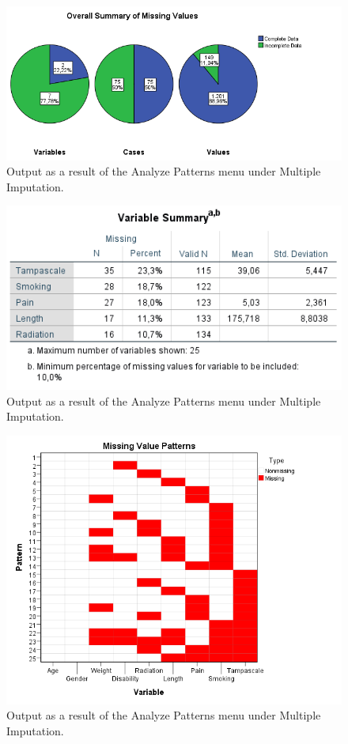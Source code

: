 \documentclass[
]{book}
\begin{document}
\begin{figure}

{\centering \includegraphics[width=0.9\linewidth]{images/fig2.6a} 

}

\caption{Output as a result of the Analyze Patterns menu under Multiple Imputation.}\label{fig:fig2-6-1}
\end{figure}
\begin{figure}

{\centering \includegraphics[width=0.9\linewidth]{images/fig2.6b} 

}

\caption{Output as a result of the Analyze Patterns menu under Multiple Imputation.}\label{fig:fig2-6-2}
\end{figure}
\begin{figure}

{\centering \includegraphics[width=0.9\linewidth]{images/fig2.6c} 

}

\caption{Output as a result of the Analyze Patterns menu under Multiple Imputation.}\label{fig:fig2-6-3}
\end{figure}
\end{document}
